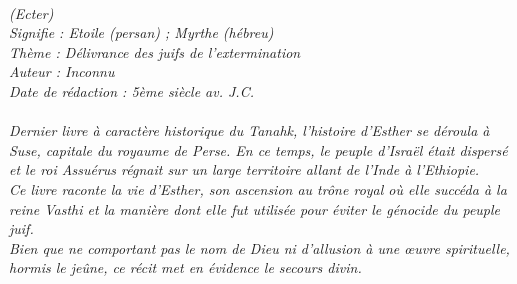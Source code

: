 \BFont
\noindent\hrulefill
{\footnotesize
\textit{
\bigskip
{\centering{}
\\(Ecter)
\\Signifie : Etoile (persan) ; Myrthe (hébreu)
\\Thème : Délivrance des juifs de l’extermination
\\Auteur : Inconnu
\\Date de rédaction : 5ème siècle av. J.C.\\}
}
\textit{
\\Dernier livre à caractère historique du Tanahk, l’histoire d’Esther se déroula à Suse, capitale du royaume de Perse. En ce temps, le peuple d’Israël était dispersé et le roi Assuérus régnait sur un large territoire allant de l’Inde à l'Ethiopie.
\bigskip
\\Ce livre raconte la vie d’Esther, son ascension au trône royal où elle succéda à la reine Vasthi et la manière dont elle fut utilisée pour éviter le génocide du peuple juif.  
\bigskip
\\Bien que ne comportant pas le nom de Dieu ni d’allusion à une œuvre spirituelle, hormis le jeûne, ce récit met en évidence le secours divin.\bigskip
}
}
\par\nobreak\noindent\hrulefill
